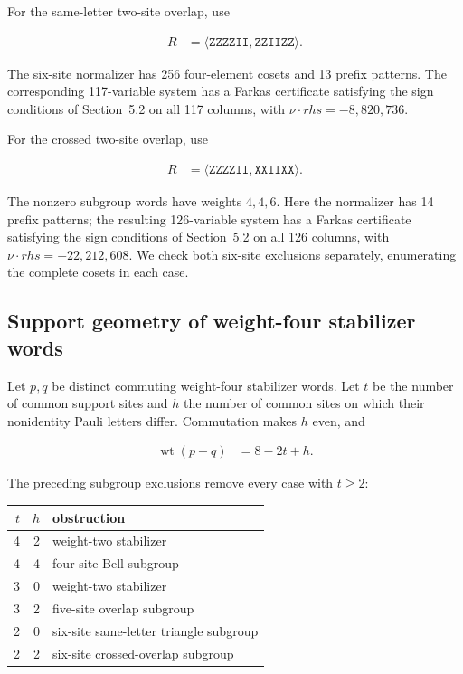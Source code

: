 \documentclass[11pt]{article}
\begin{document}
For the same-letter two-site overlap, use

\[
\begin{aligned}
R &=\langle  \mathtt{ZZZZII}, \mathtt{ZZIIZZ}  \rangle.
\end{aligned}
\]

The six-site normalizer has 256 four-element cosets and 13 prefix patterns. The corresponding 117-variable system has a Farkas certificate satisfying the sign conditions of Section~5.2 on all 117 columns, with \(\nu \cdot rhs=-8{,}820{,}736\).

For the crossed two-site overlap, use

\[
\begin{aligned}
R &=\langle  \mathtt{ZZZZII}, \mathtt{XXIIXX}  \rangle.
\end{aligned}
\]

The nonzero subgroup words have weights \(4,4,6\). Here the normalizer has 14 prefix patterns; the resulting 126-variable system has a Farkas certificate satisfying the sign conditions of Section~5.2 on all 126 columns, with \(\nu \cdot rhs=-22{,}212{,}608\). We check both six-site exclusions separately, enumerating the complete cosets in each case.

\subsection{Support geometry of weight-four stabilizer words}\label{support-geometry-of-weight-four-checks}

Let \(p,q\) be distinct commuting weight-four stabilizer words. Let \(t\) be the number of common support sites and \(h\) the number of common sites on which their nonidentity Pauli letters differ. Commutation makes \(h\) even, and

\[
\begin{aligned}
\operatorname{wt}(p+q) &=8 - 2t + h.
\end{aligned}
\]

The preceding subgroup exclusions remove every case with \(t \ge 2\):

{\small
\setlength{\tabcolsep}{8pt}
\renewcommand{\arraystretch}{1.08}
\begin{center}
\begin{tabular}{@{}rrl@{}}
\toprule
\(t\) & \(h\) & obstruction \\
\midrule
4 & 2 & weight-two stabilizer \\
4 & 4 & four-site Bell subgroup \\
3 & 0 & weight-two stabilizer \\
3 & 2 & five-site overlap subgroup \\
2 & 0 & six-site same-letter triangle subgroup \\
2 & 2 & six-site crossed-overlap subgroup \\
\bottomrule
\end{tabular}
\end{center}
}
\end{document}
